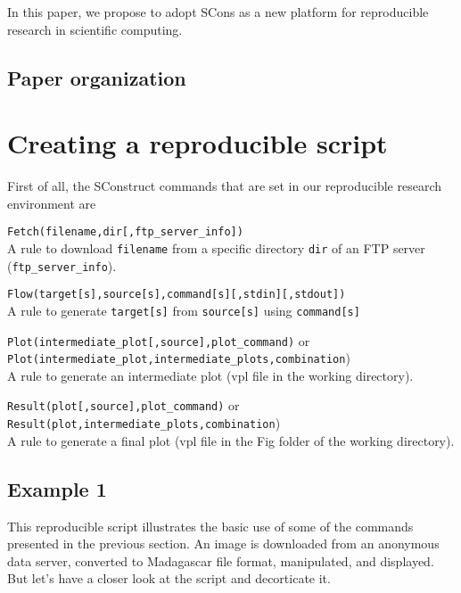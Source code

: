 In this paper, we propose to adopt SCons as a new platform for
reproducible research in scientific computing.

\subsection{Paper organization}

\newpage
\section{Creating a reproducible script}
%
First of all, the SConstruct commands that are set in our reproducible
research environment are

\noindent\texttt{Fetch(filename,dir[,ftp\_server\_info])}\\
\indent A rule to download \texttt{filename} from a specific
directory \texttt{dir} of an FTP server
(\texttt{ftp\_server\_info}).

\noindent\texttt{Flow(target[s],source[s],command[s][,stdin][,stdout])}\\
\indent A rule to generate \texttt{target[s]} from \texttt{source[s]}
using \texttt{command[s]}

\noindent\texttt{Plot(intermediate\_plot[,source],plot\_command)} or\\
\texttt{Plot(intermediate\_plot,intermediate\_plots,combination})\\
\indent A rule to generate an intermediate plot (vpl file in the
working directory).

\noindent\texttt{Result(plot[,source],plot\_command)} or\\ 
\texttt{Result(plot,intermediate\_plots,combination})\\
\indent A rule to generate a final plot (vpl file in the Fig folder of
the working directory).

\subsection{Example 1}
%


This reproducible script illustrates the basic use of some of the
commands presented in the previous section. An image is downloaded
from an anonymous data server, converted to Madagascar file format,
manipulated, and displayed. But let's have a closer look at the script
and decorticate it.\\

